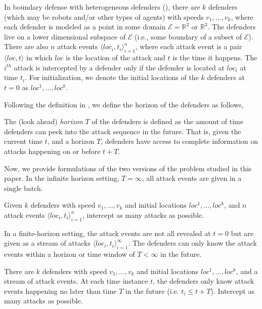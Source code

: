 In boundary defense with heterogeneous defenders (\prob), there are $k$ defenders (which may be robots and/or other types of agents) with speeds $v_1,\dots,v_k$, where each defender is modeled as a point in some domain $\mathcal E = \mathbb R^2$ or $\mathbb R^3$.
The defenders live on a lower dimensional subspace of $\mathcal E$ (i.e., some boundary of a subset of $\mathcal E$).  
There are also $n$ attack events $\big\langle loc_i, t_i\big\rangle_{i=1}^{n}$, where each attack event is a pair $\big\langle loc, t\big\rangle$ in which $loc$ is the
location of the attack and $t$ is the time it happens. 
The $i^{{th}}$ attack is intercepted by a defender only if the defender is located at $loc_i$ at time $t_i$.
For initialization, we denote the initial locations of the $k$ defenders at $t=0$ as $loc^{1},\dots, loc^{k}$. 

Following the definition in \cite{adler2022role}, we define the horizon of the defenders as follows,
\begin{definition}[Horizon]
The (look ahead) \textit{horizon} $T$ of the defenders is defined as the amount of time defenders can peek into the attack sequence in the future. That is, given the current time $t$, and a horizon $T$, defenders have access to complete information on attacks happening on or before $t+T$. 
\end{definition}

Now, we provide formulations of the two versions of the \prob problem studied in this paper. In the infinite horizon setting, $T = \infty$, all attack events are given in a single batch.

\begin{problem}\label{prob:1}
Given $k$ defenders with speed $v_1, \dots, v_k$ and initial locations $loc^1, \ldots, loc^k$, and $n$ attack events $\big\langle loc_i, t_i\big\rangle_{i=1}^{n}$, intercept as many attacks as possible. 
\end{problem}

In a finite-horizon setting, the attack events are not all revealed at $t=0$ but are given as a stream of attacks $\big\langle loc_i, t_i\big\rangle_{i=1}^{\infty}$. The defenders can only know the attack events within a horizon or time window of $T < \infty$ in the future.

\begin{problem}\label{prob:2}
There are $k$ defenders with speed $v_1, \dots, v_k$ and initial locations $loc^1, \ldots, loc^k$, and a stream of attack events.
%
At each time instance $t$, the defenders only know attack events happening no later than time $T$ in the future (i.e. $t_i \le t+T$).
%
Intercept as many attacks as possible. 
\end{problem}

